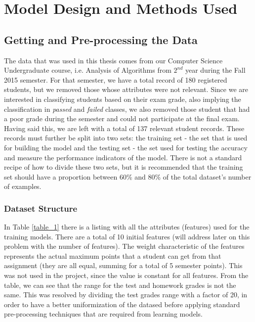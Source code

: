 \chapter{Model Design and Methods Used}

\section{Getting and Pre-processing the Data}

The data that was used in this thesis comes from our Computer Science 
Undergraduate course, i.e. Analysis of Algorithms from $2^{nd}$ year during 
the Fall 2015 semester. For that semester, we have a total record of 180 
registered students, but we removed those whose attributes were not relevant. 
Since we are interested in classifying students based on their exam grade, 
also implying the classification in {\it passed} and {\it failed} classes, 
we also removed those student that had a poor grade during the semester and 
could not participate at the final exam. Having said this, we are left with a 
total of 137 relevant student records. These records must further be split 
into two sets: the training set - the set that is used for building the model 
and the testing set - the set used for testing the accuracy and measure 
the performance indicators of the model. There is not a standard recipe of 
how to divide these two sets, but it is recommended that the training set 
should have a proportion between 60\% and 80\% of the total dataset's number 
of examples. 

\subsection{Dataset Structure}

In Table \ref{table_1} there is a listing with all the attributes (features) 
used for the training models. There are a total of 10 initial features 
(will address later on this problem with the number of features). The weight 
characteristic of the features represents the actual maximum points that a 
student can get from that assignment (they are all equal, summing for a total 
of 5 semester points). This was not used in the project, since the value is 
constant for all features. From the table, we can see that the range for the 
test and homework grades is not the same. This was resolved by dividing the 
test grades range with a factor of 20, in order to have a better uniformization 
of the datased before applying standard pre-processing techniques that are 
required from learning models.


